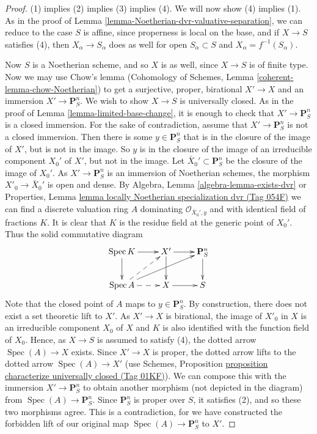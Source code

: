 \documentclass{amsart}
\theoremstyle{plain}
\theoremstyle{definition}
\theoremstyle{remark}
\numberwithin{equation}{subsection}
\def\Spec{\mathop{\mathrm{Spec}}}
\begin{document}
\begin{proof}
(1) implies (2) implies (3) implies (4).  We will now show (4) implies
(1).  As in the proof of Lemma \ref{lemma-Noetherian-dvr-valuative-separation},
we can reduce to the
case $S$ is affine, since properness is local on the base, and if $X
\to S$ satisfies (4), then $X_\alpha \to S_\alpha$ does as well for
open $S_\alpha \subset S$ and $X_\alpha = f^{-1}(S_\alpha)$.

\medskip\noindent
Now $S$ is a Noetherian scheme, and so $X$ is as well, since $X \to
S$ is of finite type.  Now we may use Chow's lemma
(Cohomology of Schemes, Lemma \ref{coherent-lemma-chow-Noetherian})
to get a surjective, proper, birational
$X' \to X$ and an immersion $X' \to \mathbf{P}^n_S$.  We wish to
show $X \to S$ is universally closed.  As in the proof of Lemma
\ref{lemma-limited-base-change}, it is enough to check that
$X' \to \mathbf{P}^n_S$ is a closed immersion.
For the sake of contradiction, assume that $X' \to
\mathbf{P}^n_S$ is not a closed immersion.  Then there is some $y
\in \mathbf{P}^n_S$ that is in the closure of the image of $X'$, but
is not in the image.  So $y$ is in the closure of the image of an
irreducible component $X_0'$ of $X'$, but not in the image.
Let $\bar X_0' \subset \mathbf{P}^n_S$ be the closure of
the image of $X_0'$. As $X' \to \mathbf{P}^n_S$ is an immersion
of Noetherian schemes, the morphism $X'_0 \to \bar X_0'$ is
open and dense. By
Algebra, Lemma \ref{algebra-lemma-exists-dvr}
or
Properties, Lemma \href{https://stacks.math.columbia.edu/tag/054F}{lemma locally Noetherian specialization dvr (Tag 054F)}
we can find a discrete valuation ring $A$ dominating
$\mathcal{O}_{\bar X_0', y}$ and with identical field
of fractions $K$. It is clear that
$K$ is the residue field at the generic point of $X_0'$.
Thus the solid commutative diagram
\begin{equation}
\label{equation-solid}
\xymatrix{
\Spec K \ar[r] \ar[d] & X' \ar [r] \ar[d] &
\mathbf{P}^n_S \ar[d] \\
\Spec A \ar@{-->}[r] \ar@{-->}[ru] \ar[urr] & X \ar[r] & S\\
}
\end{equation}
Note that the closed point of $A$ maps to $y \in \mathbf{P}^n_S$.  By
construction, there does not exist a set theoretic lift to $X'$.
As $X' \to X$ is birational, the image of $X'_0$ in $X$ is an
irreducible component $X_0$ of $X$ and $K$ is also identified with
the function field of $X_0$. Hence, as $X \to S$ is assumed to satisfy (4),
the dotted arrow $\Spec(A) \to X$ exists.
Since $X' \to X$ is proper, the dotted
arrow lifts to the dotted arrow $\Spec(A) \to X'$ (use Schemes,
Proposition \href{https://stacks.math.columbia.edu/tag/01KF}{proposition characterize universally closed (Tag 01KF)}).
We can compose this with the immersion $X' \to \mathbf{P}^n_S$ to obtain
another morphism (not depicted in the diagram) from
$\Spec(A) \to \mathbf{P}^n_S$.  Since $\mathbf{P}^n_S$
is proper over $S$, it satisfies (2), and so these two morphisms
agree.  This is a contradiction, for we have constructed the
forbidden lift of our original map $\Spec(A) \to \mathbf{P}^n_S$
to $X'$.
\end{proof}
\end{document}
